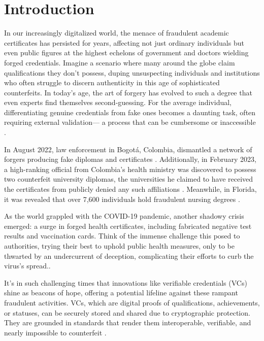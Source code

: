 \section{Introduction}

In our increasingly digitalized world, the menace of fraudulent academic certificates has persisted for years\cite{forbes2023}, affecting not just ordinary individuals but even public figures at the highest echelons of government \cite{actionsa2023} and doctors wielding forged credentials\cite{forbes2023}. Imagine a scenario where many around the globe claim qualifications they don't possess, duping unsuspecting individuals and institutions who often struggle to discern authenticity in this age of sophisticated counterfeits. In today's age, the art of forgery has evolved to such a degree that even experts find themselves second-guessing. For the average individual, differentiating genuine credentials from fake ones becomes a daunting task, often requiring external validation— a process that can be cumbersome or inaccessible \cite{universityAffairs2023}.

In August 2022, law enforcement in Bogotá, Colombia, dismantled a network of forgers producing fake diplomas and certificates \cite{elTiempo2022}. Additionally, in February 2023, a high-ranking official from Colombia's health ministry was discovered to possess two counterfeit university diplomas, the universities he claimed to have received the certificates from publicly denied any such affiliations \cite{rcn2023}. Meanwhile, in Florida, it was revealed that over 7,600 individuals hold fraudulent nursing degrees \cite{telemundo2023}.

As the world grappled with the COVID-19 pandemic, another shadowy crisis emerged: a surge in forged health certificates, including fabricated negative test results and vaccination cards. Think of the immense challenge this posed to authorities, trying their best to uphold public health measures, only to be thwarted by an undercurrent of deception, complicating their efforts to curb the virus's spread.\cite{threatpost2021}\cite{usaAttourney2023}\cite{washingtonPost2023}\cite{fox13now2023}.

It's in such challenging times that innovations like verifiable credentials (VCs) shine as beacons of hope, offering a potential lifeline against these rampant fraudulent activities. VCs, which are digital proofs of qualifications, achievements, or statuses, can be securely stored and shared due to cryptographic protection. They are grounded in standards that render them interoperable, verifiable, and nearly impossible to counterfeit \cite{newYorkTimes2023}.

